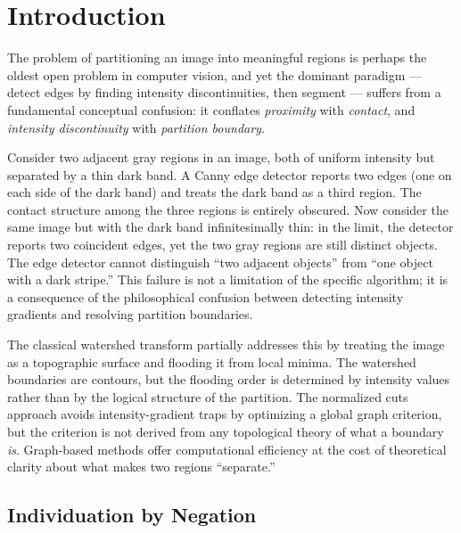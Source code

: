 \documentclass[twocolumn]{article}
\theoremstyle{plain}
\theoremstyle{definition}
\begin{document}
\section{Introduction}
\label{sec:introduction}

The problem of partitioning an image into meaningful regions is perhaps the
oldest open problem in computer vision, and yet the dominant paradigm --- detect
edges by finding intensity discontinuities, then segment --- suffers from a
fundamental conceptual confusion: it conflates \emph{proximity} with
\emph{contact}, and \emph{intensity discontinuity} with \emph{partition
boundary}.

Consider two adjacent gray regions in an image, both of uniform intensity but
separated by a thin dark band. A Canny edge detector \cite{canny1986computational}
reports two edges (one on each side of the dark band) and treats the dark band
as a third region. The contact structure among the three regions is entirely
obscured. Now consider the same image but with the dark band infinitesimally
thin: in the limit, the detector reports two coincident edges, yet the two gray
regions are still distinct objects. The edge detector cannot distinguish
``two adjacent objects'' from ``one object with a dark stripe.'' This failure is
not a limitation of the specific algorithm; it is a consequence of the
philosophical confusion between detecting intensity gradients and resolving
partition boundaries.

The classical watershed transform \cite{beucher1979use, vincent1991watersheds}
partially addresses this by treating the image as a topographic surface and
flooding it from local minima. The watershed boundaries are contours, but the
flooding order is determined by intensity values rather than by the logical
structure of the partition. The normalized cuts approach
\cite{shi2000normalized} avoids intensity-gradient traps by optimizing a global
graph criterion, but the criterion is not derived from any topological theory of
what a boundary \emph{is}. Graph-based methods
\cite{felzenszwalb2004efficient, boykov2004experimental} offer computational
efficiency at the cost of theoretical clarity about what makes two regions
``separate.''

\subsection{Individuation by Negation}
\end{document}
